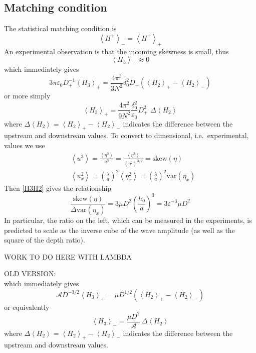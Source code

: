 \documentclass[11pt]{article}
\newcommand{\vsp}[1]{\vspace{#1 pc} \noindent}
\newcommand{\mean}[1]{\left< #1 \right>}
\newcommand{\eps}{\varepsilon}
\newcommand{\lam}{\lambda}
\newcommand{\lamfac}{N}
\newcommand{\drat}{D}
\newcommand{\dratdn}{\drat_+}
\newcommand{\skw}{\text{skew}}
\newcommand{\var}{\text{var}}
\newcommand{\epsup}{\eps_0}
\newcommand{\delup}{\delta_0}
\newcommand{\ampp}{\mathcal{A}}
\newcommand{\Ham}{H}
\newcommand{\Hdn}{\Ham^{+}}
\newcommand{\meanup}[1]{\mean{#1}_{-}}
\newcommand{\meandn}[1]{\mean{#1}_{+}}
\begin{document}
\subsection{Matching condition}

The statistical matching condition is
\begin{equation}
\meanup{\Hdn} = \meandn{\Hdn}
\end{equation}
An experimental observation is that the incoming skewness is small, thus
\begin{equation}
\meanup{H_3} \approx 0
\end{equation}
which immediately gives
\begin{equation}
3 \pi \epsup \dratdn^{-1} \meandn{H_3} = \frac{4 \pi^3}{3 \lamfac^2} \delup^2 \dratdn \left( \meandn{H_2} - \meanup{H_2} \right)
\end{equation}
or more simply
\begin{equation}
\label{H3H2}
\meandn{H_3} = \frac{4 \pi^2}{9 \lamfac^2} \frac{\delup^2}{\epsup} \dratdn^2 \,\, \Delta \mean{H_2}
\end{equation}
where $\Delta \mean{H_2} =  \meandn{H_2} - \meanup{H_2}$  indicates the difference between the upstream and downstream values.
To convert to dimensional, i.e.~experimental, values we use
\begin{align}
&\mean{u^3} = \frac{\mean{\eta^3}}{a^3} = 
\frac{\mean{\eta^3}}{\mean{\eta^2}^{3/2}} = \skw(\eta) \\
&\mean{u_x^2} = \left(\frac{\lam}{a} \right)^2 \mean{\eta_x^2} 
= \left(\frac{\lam}{a} \right)^2 \var(\eta_x)
\end{align}
Then \eqref{H3H2} gives the relationship
\begin{equation}
\frac{\skw(\eta)}{\Delta \var(\eta_x)} =
3 \mu D^2 \left( \frac{h_0}{a} \right)^3 = 3 \eps^{-3} \mu D^2
\end{equation}
In particular, the ratio on the left, which can be measured in the experiments, is predicted to scale as the inverse cube of the wave amplitude (as well as the square of the depth ratio).

WORK TO DO HERE WITH LAMBDA






\vsp{10}
OLD VERSION: \\
which immediately gives
\begin{equation}
\ampp D^{-3/2} \meandn{H_3} = \mu D^{1/2} \left( \meandn{H_2} - \meanup{H_2} \right)
\end{equation}
or equivalently
\begin{equation}
\label{H3H2}
\meandn{H_3} = \frac{\mu D^{2}}{\ampp} \, \Delta \mean{H_2}
\end{equation}
where $\Delta \mean{H_2} =  \meandn{H_2} - \meanup{H_2}$  indicates the difference between the upstream and downstream values.
\end{document}
